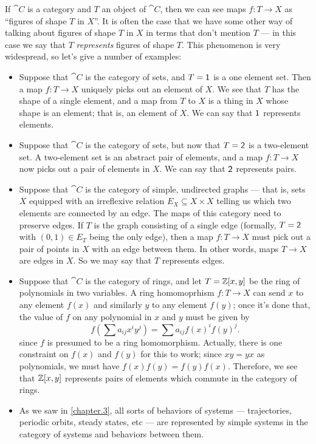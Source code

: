 \documentclass[DynamicalBook]{subfiles}
\begin{document}
If $\cat{C}$ is a category and $T$ an object of $\cat{C}$, then we can see maps $f : T
\to X$ as ``figures of shape $T$ in $X$''. It is often the case that we have
some other way of talking about figures of shape $T$ in $X$ in terms that don't
mention $T$ --- in this case we say that $T$ \emph{represents} figures of shape
$T$. This phenomenon is very widespread,
so let's give a number of examples:
\begin{itemize}
  \item Suppose that $\cat{C}$ is the category of sets, and $T = \mathsf{1}$ is a one
    element set. Then a map $f : T \to X$ uniquely picks out an element of $X$.
    We see that $T$ has the shape of a single element, and a map from $T$ to $X$
    is a thing in $X$ whose shape is an element; that is, an element of $X$. We
    can say that $\mathsf{1}$ represents elements.
   \item Suppose that $\cat{C}$ is the category of sets, but now that $T = \mathsf{2}$
     is a two-element set. A two-element set is an abstract pair of elements,
     and a map $f : T \to X$ now picks out a pair of elements in $X$. We can say
     that $\mathsf{2}$ represents pairs.
   \item Suppose that $\cat{C}$ is the category of simple, undirected graphs --- that
     is, sets $X$ equipped with an irreflexive relation $E_X \subseteq X \times
     X$ telling us which two elements are connected by an edge. The maps of this
     category need to preserve edges. If $T$ is the graph consisting of a single
     edge (formally, $T = \mathsf{2}$ with $(0, 1) \in E_T$ being the only edge),
     then a map $f : T \to X$ must pick out a pair of points in $X$ with an edge
     between them. In other words, maps $T \to X$ are edges in $X$. So we may
     say that $T$ represents edges.
   \item Suppose that $\cat{C}$ is the category of rings, and let $T = \mathbb{Z}[x, y]$ be
     the ring of polynomials in two variables. A ring homomoprhism $f : T \to X$
     can send $x$ to any element $f(x)$ and similarly $y$ to any element $f(y)$;
     once it's done that, the value of $f$ on any polynomial in $x$ and $y$ must
     be given by
     $$f\left( \sum a_{ij}x^iy^j \right) = \sum a_{ij}f(x)^if(y)^j.$$
     since $f$ is presumed to be a ring homomorphism. Actually, there is one
     constraint on $f(x)$ and $f(y)$ for this to work; since $xy = yx$ as
     polynomials, we must have $f(x)f(y) = f(y)f(x)$. Therefore, we see that
     $\mathbb{Z}[x, y]$ represents pairs of elements which commute in the category of rings.
     \item As we saw in \cref{chapter.3}, all sorts of behaviors of systems ---
       trajectories, periodic orbits, steady states, etc --- are represented
       by simple systems in the category of systems and behaviors between them. 
\end{itemize}
\end{document}
